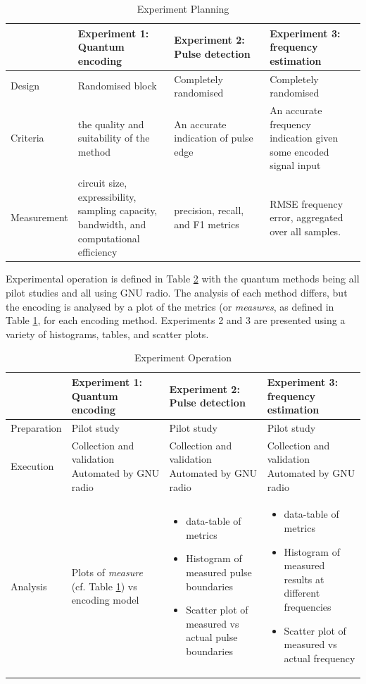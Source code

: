 \begin{table}[ht]
\caption{Experiment Planning}
\label{tab:exp_planning}
\begin{tabular}{p{0.16\linewidth}|p{0.28\linewidth}p{0.28\linewidth}p{0.28\linewidth}}
\hline
& Experiment 1: Quantum encoding & Experiment 2: Pulse detection & Experiment 3: frequency estimation \\
\hline
Design & Randomised block & Completely randomised & Completely randomised \\
Criteria & the quality and suitability of the method & An accurate  indication of pulse edge & An accurate frequency indication given some encoded signal input \\
Measurement & circuit size, expressibility, sampling capacity, bandwidth, and   computational efficiency & precision, recall, and F1 metrics & \ac{RMSE} frequency error, aggregated over all samples. \\
\hline
\end{tabular}
\end{table}

Experimental operation is defined in Table \ref{tab:exp_operation} with the quantum methods being all pilot studies and all using GNU radio.
The analysis of each method differs, but the encoding is analysed by a plot of the metrics (or \textit{measures}, as defined in Table \ref{tab:exp_planning}, for each encoding method.
Experiments 2 and 3 are presented using a variety of histograms, tables, and scatter plots.

\begin{table}[ht]
\caption{Experiment Operation}
\label{tab:exp_operation}
\begin{tabular}{p{0.16\linewidth}|p{0.28\linewidth}p{0.28\linewidth}p{0.28\linewidth}}
\hline
& Experiment 1: Quantum encoding & Experiment 2: Pulse detection & Experiment 3: frequency estimation \\
\hline
Preparation & Pilot study & Pilot study & Pilot study \\
Execution & Collection and validation Automated by GNU radio & Collection and validation Automated by GNU radio & Collection and validation Automated by GNU radio \\
Analysis & Plots of \textit{measure} (cf. Table \ref{tab:exp_planning}) vs encoding model &
\begin{itemize}
    \item data-table of metrics
    \item Histogram of measured pulse boundaries
    \item Scatter plot of measured vs actual pulse boundaries
\end{itemize}
&
\begin{itemize}
    \item data-table of metrics
    \item Histogram of measured results at different frequencies
    \item Scatter plot of measured vs actual frequency
\end{itemize}\\
\hline
\end{tabular}
\end{table}

